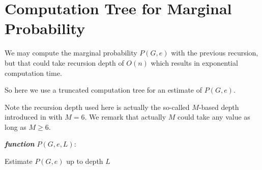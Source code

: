 
\section{Computation Tree for Marginal Probability}

We may compute the marginal probability $P(G, e)$ with the previous recursion, but
that could take recursion depth of $O(n)$ which results in exponential computation time.

So here we use a truncated computation tree for an estimate of $P(G,e)$.

Note the recursion depth used here is actually the so-called $M$-based depth introduced in \cite{LLY12} with $M=6$. We remark that actually $M$ could take any value as long as $M \geq 6$.

\IncMargin{1em}
\begin{algorithm}[H]
\emph{ \textbf{function} $P(G, e, L):$}
\BlankLine
{}
 \caption{Estimate $P(G,e)$ up to depth $L$}
\end{algorithm}
\DecMargin{1em}

